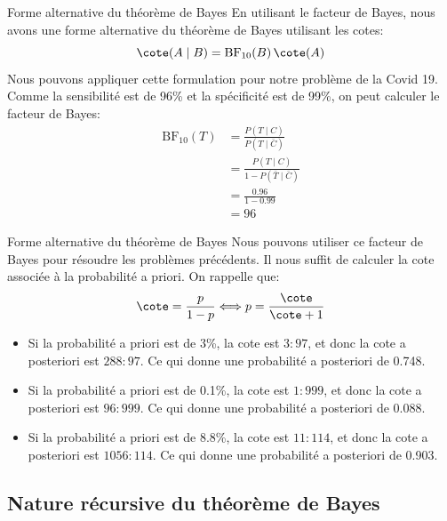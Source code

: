 \begin{frame}{Forme alternative du théorème de Bayes}
	En utilisant le facteur de Bayes, nous avons une forme alternative du théorème de Bayes utilisant les cotes:
	\begin{equation}
		\cote(A \mid B) = \text{BF}_{10}(B) \, \cote(A)
		\nonumber
	\end{equation}
	\pause
	Nous pouvons appliquer cette formulation pour notre problème de la Covid 19. Comme la sensibilité est de 96\% et la spécificité est de 99\%, on peut calculer le facteur de Bayes:
	\begin{equation}
		\begin{aligned}
			\text{BF}_{10}(T) &= \frac{P(T \mid C)}{P(T \mid \bar{C})} \\
			&= \frac{P(T \mid C)}{1 - P(\bar{T} \mid \bar{C})} \\
			&= \frac{0.96}{1 - 0.99} \\
			&= 96
		\end{aligned}
		\nonumber
	\end{equation}
\end{frame}

\begin{frame}{Forme alternative du théorème de Bayes}
	Nous pouvons utiliser ce facteur de Bayes pour résoudre les problèmes précédents. Il nous suffit de calculer la cote associée à la probabilité a priori. On rappelle que:
	\begin{equation}
		\cote = \frac{p}{1 - p}  \Longleftrightarrow p = \frac{\cote}{\cote + 1}
		\nonumber
	\end{equation}
	\begin{itemize}
		\item Si la probabilité a priori est de 3\%, la cote est $3:97$, et donc la cote a posteriori est $288:97$. Ce qui donne une probabilité a posteriori de 0.748.
		\item Si la probabilité a priori est de 0.1\%, la cote est $1:999$, et donc la cote a posteriori est $96:999$. Ce qui donne une probabilité a posteriori de 0.088.
		\item Si la probabilité a priori est de 8.8\%, la cote est $11:114$, et donc la cote a posteriori est $1056:114$. Ce qui donne une probabilité a posteriori de 0.903.
	\end{itemize}
\end{frame}

\subsection{Nature récursive du théorème de Bayes}

